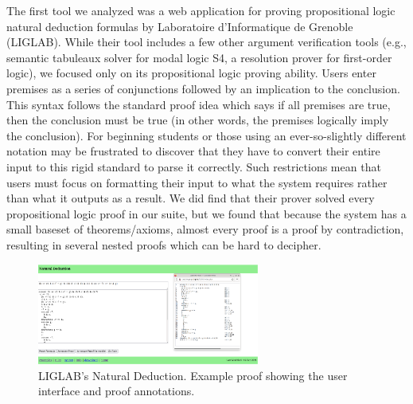 \documentclass[ms]{uncgdissertationexp2}
\theoremstyle{plain}
\theoremstyle{definition}
\theoremstyle{remark}
\newcommand{\titlecaption}[2]{\caption[#1]{#1. #2}}
\begin{document}
    The first tool we analyzed was a web application for proving propositional logic natural deduction formulas by Laboratoire d'Informatique de Grenoble (LIGLAB). While their tool includes a few other argument verification tools (e.g., semantic tabuleaux solver for modal logic S4, a resolution prover for first-order logic), we focused only on its propositional logic proving ability. Users enter premises as a series of conjunctions followed by an implication to the conclusion. This syntax follows the standard proof idea which says if all premises are true, then the conclusion must be true (in other words, the premises logically imply the conclusion). For beginning students or those using an ever-so-slightly different notation may be frustrated to discover that they have to convert their entire input to this rigid standard to parse it correctly. Such restrictions mean that users must focus on formatting their input to what the system requires rather than what it outputs as a result. We did find that their prover solved every propositional logic proof in our suite, but we found that because the system has a small baseset of theorems/axioms, almost every proof is a proof by contradiction, resulting in several nested proofs which can be hard to decipher.
    \begin{figure}
        \centering
        \includegraphics[width=0.65\textwidth]{teachinglogic.png}
        \titlecaption{LIGLAB's Natural Deduction}{Example proof showing the user interface and proof annotations.}
        \label{fig:liglab}
    \end{figure} 
\end{document}
